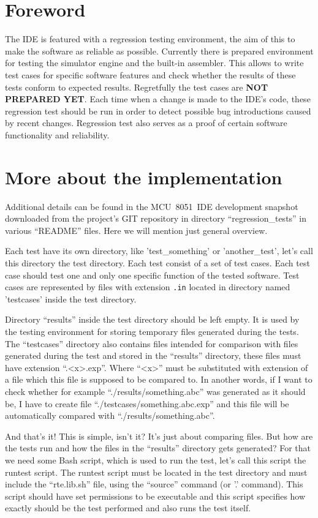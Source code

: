 \documentclass[a4paper,twoside,12pt]{book}
\newcommand{\fileextension}[1]{\texttt{#1}}
\begin{document}
	\section{Foreword}
		The IDE is featured with a regression testing environment, the aim of this to make the software as reliable as possible. Currently there is prepared environment for testing the simulator engine and the built-in assembler. This allows to write test cases for specific software features and check whether the results of these tests conform to expected results. Regretfully the test cases are \textbf{NOT PREPARED YET}. Each time when a change is made to the IDE's code, these regression test should be run in order to detect possible bug introductions caused by recent changes. Regression test also serves as a proof of certain software functionality and reliability.

	\section{More about the implementation}
		Additional details can be found in the MCU~8051~IDE development snapshot downloaded from the project's GIT repository in directory ``regression\_tests'' in various ``README'' files. Here we will mention just general overview.

		Each test have its own directory, like 'test\_something' or 'another\_test', let's call this directory the test directory. Each test consist of a set of test cases. Each test case should test one and only one specific function of the tested software. Test cases are represented by files with extension \fileextension{.in} located in directory named 'testcases' inside the test directory.

		Directory ``results'' inside the test directory should be left empty. It is used by the testing environment for storing temporary files generated during the tests. The ``testcases'' directory also contains files intended for comparison with files generated during the test and stored in the ``results'' directory, these files must have extension ``.<x>.exp''. Where ``<x>'' must be substituted with extension of a file which this file is supposed to be compared to. In another words, if I want to check whether for example ``./results/something.abc'' was generated as it should be, I have to create file ``./testcases/something.abc.exp'' and this file will be automatically compared with ``./results/something.abc''.

		And that's it! This is simple, isn't it? It's just about comparing files. But how are the tests run and how the files in the ``results'' directory gets generated? For that we need some Bash script, which is used to run the test, let's call this script the runtest script. The runtest script must be located in the test directory and must include the ``rte.lib.sh'' file, using the ``source'' command (or '.' command). This script should have set permissions to be executable and this script specifies how exactly should be the test performed and also runs the test itself.
\end{document}
